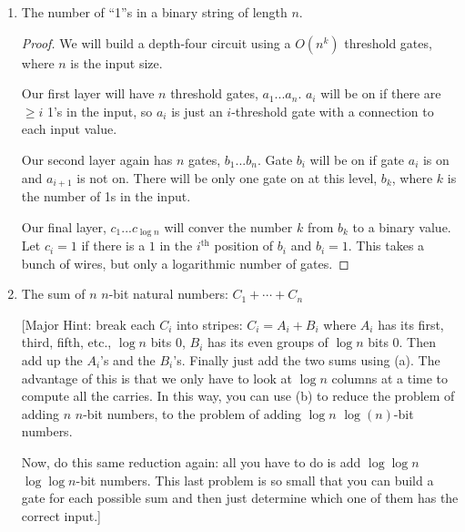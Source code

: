 \documentclass[12pt]{article}
\begin{document}
\begin{enumerate}
\begin{enumerate}
    \begin{proof}
      In the \href{https://people.cs.umass.edu/~immerman/cs601/lect7.pdf}{descriptive complexity lecture}, we showed that addition is contained in $FO$. In the \href{https://people.cs.umass.edu/~immerman/cs601/lect12.pdf}{circuit complexity lecture}, we showed that $FO = AC^0 \in \thc^0$.
    \end{proof}

  \item The number of ``1''s in a binary string of length $n$.

    \begin{proof}
      We will build a depth-four circuit using a $O(n^k)$ threshold gates, where $n$ is the input size.

      Our first layer will have $n$ threshold gates, $a_1...a_n$. $a_i$ will be on if there are $\geq i$ 1's in the input, so $a_i$ is just an $i$-threshold gate with a connection to each input value.

      Our second layer again has $n$ gates, $b_1...b_n$. Gate $b_i$ will be on if gate $a_i$ is on and $a_{i+1}$ is not on. There will be only one gate on at this level, $b_k$, where $k$ is the number of 1s in the input.

      Our final layer, $c_1...c_{\log{n}}$ will conver the number $k$ from $b_k$ to a binary value. Let $c_i=1$ if there is a $1$ in the $i^{\text{th}}$ position of $b_i$ and $b_i=1$. This takes a bunch of wires, but only a logarithmic number of gates.
    \end{proof}

  \item The sum of $n$ $n$-bit natural numbers: $C_1 + \cdots + C_n$

    [Major Hint: break each $C_i$ into stripes: $C_i = A_i + B_i$ where $A_i$
      has its first, third, fifth, etc.,  $\log n$ bits 0, $B_i$ has its even
      groups of $\log n$ bits 0.  Then add up the $A_i$'s and the
      $B_i$'s.  Finally just add the two sums using (a). The advantage of this is
      that we only have to look at $\log n$ columns at a time to compute all the
      carries.  In this way, you can use (b) to  reduce the problem of adding $n$ $n$-bit
      numbers, to the problem of adding $\log n$ $\log(n)$-bit numbers.

      Now, do this same reduction again: all you have to do is add $\log \log n$
      $\log \log n$-bit numbers.  This last problem is so small that you can
      build a gate for each possible sum and then just determine which one of
      them has the correct input.]


\end{enumerate}
\end{enumerate}
\end{document}

